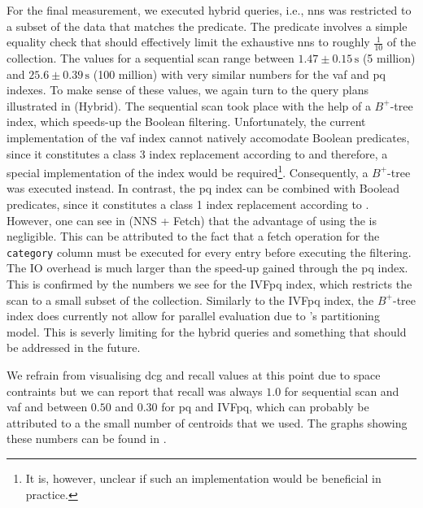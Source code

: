 For the final measurement, we executed hybrid queries, i.e., \acrshort{nns} was restricted to a subset of the data that matches the predicate. The predicate involves a simple equality check that should effectively limit the exhaustive \acrshort{nns} to roughly $\frac{1}{10}$ of the collection. The values for a sequential scan range between $1.47 \pm 0.15 \, \si{\second}$ (5 million) and $25.6 \pm 0.39 \, \si{\second}$ (100 million) with very similar numbers for the \acrshort{vaf} and \acrshort{pq} indexes. To make sense of these values, we again turn to the query plans illustrated in  (Hybrid). The sequential scan took place with the help of a $B^{+}$-tree index, which speeds-up the Boolean filtering. Unfortunately, the current implementation of the \acrshort{vaf} index cannot natively accomodate Boolean predicates, since it constitutes a class 3 index replacement according to  and therefore, a special implementation of the index would be required\footnote{It is, however, unclear if such an implementation would be beneficial in practice.}. Consequently, a $B^{+}$-tree was executed instead. In contrast, the \acrshort{pq} index can be combined with Boolead predicates, since it constitutes a class 1 index replacement according to . However, one can see in  (NNS + Fetch) that the advantage of using the is negligible.
This can be attributed to the fact that a fetch operation for the \texttt{category} column must be executed for every entry before executing the filtering. The IO overhead is much larger than the speed-up gained through the \acrshort{pq} index. This is confirmed by the numbers we see for the IVF\acrshort{pq} index, which restricts the scan to a small subset of the collection. Similarly to the IVF\acrshort{pq} index, the $B^{+}$-tree index does currently not allow for parallel evaluation due to \cottontail{}'s partitioning model. This is severly limiting for the hybrid queries and something that should be addressed in the future.

We refrain from visualising \acrshort{dcg} and recall values at this point due to space contraints but we can report that recall was always $1.0$ for sequential scan and \acrshort{vaf} and between $0.50$ and $0.30$ for \acrshort{pq} and IVF\acrshort{pq}, which can probably be attributed to a the small number of centroids that we used. The graphs showing these numbers can be found in .


